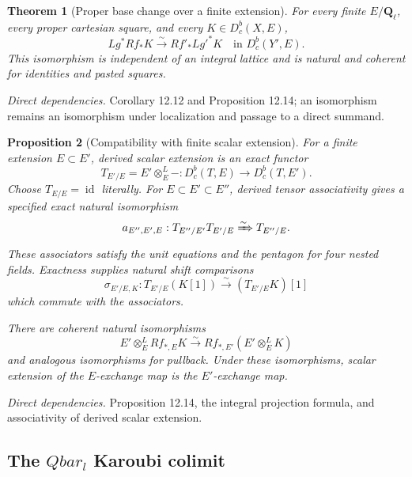 \documentclass[10pt]{article}
\newtheorem{theorem}{Theorem}[section]
\newtheorem{proposition}[theorem]{Proposition}
\theoremstyle{definition}
\newcommand{\Ql}{\mathbf Q_\ell}
\newcommand{\Qlb}{\overline{\mathbf Q}_\ell}
\newcommand{\Dbc}{D^b_c}
\newcommand{\deps}[1]{\par\smallskip\textit{Direct dependencies.} #1\par}
\def\Qlb{Qbar_l}%
\begin{document}
\begin{theorem}[Proper base change over a finite extension]
For every finite $E/\Ql$, every proper cartesian square, and every
$K\in\Dbc(X,E)$,
\[
 Lg^*Rf_*K\xrightarrow{\sim}Rf'_*Lg'^*K
 \quad\text{in }\Dbc(Y',E).
\]
This isomorphism is independent of an integral lattice and is natural and
coherent for identities and pasted squares.
\end{theorem}
\deps{Corollary 12.12 and Proposition 12.14; an isomorphism remains an
isomorphism under localization and passage to a direct summand.}

\begin{proposition}[Compatibility with finite scalar extension]
For a finite extension $E\subset E'$, derived scalar extension is an exact
functor
\[
 T_{E'/E}=E'\otimes_E^L-:
 \Dbc(T,E)\longrightarrow\Dbc(T,E').
\]
Choose $T_{E/E}=\operatorname{id}$ literally.  For
$E\subset E'\subset E''$, derived tensor associativity gives a specified
exact natural isomorphism
\[
 a_{E'',E',E}:T_{E''/E'}T_{E'/E}
 \xRightarrow{\sim}T_{E''/E}.
\]
These associators satisfy the unit equations and the pentagon for four
nested fields.  Exactness supplies natural shift comparisons
\[
 \sigma_{E'/E,K}:T_{E'/E}(K[1])
 \xrightarrow{\sim}(T_{E'/E}K)[1]
\]
which commute with the associators.

There are coherent natural isomorphisms
\[
 E'\otimes_E^LRf_{*,E}K\xrightarrow{\sim}
 Rf_{*,E'}(E'\otimes_E^LK)
\]
and analogous isomorphisms for pullback.  Under these isomorphisms, scalar
extension of the $E$-exchange map is the $E'$-exchange map.
\end{proposition}
\deps{Proposition 12.14, the integral projection formula, and associativity
of derived scalar extension.}

\subsection{The \texorpdfstring{$\Qlb$}{Qbar-l} Karoubi colimit}
\end{document}
